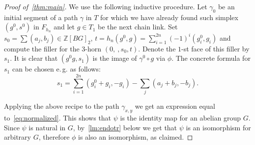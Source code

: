 \documentclass[oneside, 12pt]{amsart}
\theoremstyle{plain}
\numberwithin{equation}{section}
\numberwithin{lemma}{section}
\theoremstyle{remark}
\theoremstyle{definition}
\newcommand{\ZZ}{\mathbb{Z}}
\begin{document}
\begin{proof}[Proof of~\cref{thm:main}]
We use the following inductive procedure. Let $\gamma_0$ be an initial segment of a path $\gamma$ in $T$ for which we have already found such simplex
 $(g^0, s^0)$ in $F_{h_n}$ and let $g \in T_1$ be the next chain link. 
Set $s_0 = \sum (a_j, b_j) \in\ZZ[BG]_2$, $t = h_n (g^0, g) = \sum_{i=1}^{2n}(-1)^i(g^0_i, g_i)$
and compute the filler for the $3$-horn $(0,\ , s_0, t)$. Denote the $1$-st face of this filler by $s_1$.
It is clear that $(g^0g, s_1)$ is the image of $\gamma^0 \circ g$ via $\phi$.
The concrete formula for $s_1$ can be chosen e.\,g. as follows:
\[s_1 = \sum_{i=1}^{2n}(g^0_i + g_i, -g_i) - \sum_j (a_j + b_j, -b_j).\]

Applying the above recipe to the path $\gamma_{x, y}$ we get an expression equal to~\eqref{eq:normalized}.
 This shows that $\psi$ is the identity map for an abelian group $G$.
Since $\psi$ is natural in $G$, by~\cref{lm:endotr} below we get that $\psi$ is an isomorphism for arbitrary $G$,
 therefore $\phi$ is also an isomorphism, as claimed.
\end{proof}
\end{document}
